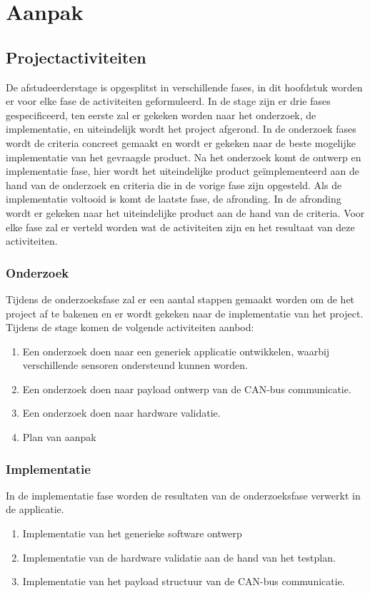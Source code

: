 \chapter{Aanpak} \label{ch:aanpak}

\section{Projectactiviteiten}
De afstudeerderstage is opgesplitst in verschillende fases, in dit hoofdstuk worden er voor elke fase de activiteiten geformuleerd. In de stage zijn er drie fases gespecificeerd, ten eerste zal er gekeken worden naar het onderzoek, de implementatie, en uiteindelijk wordt het project afgerond. In de onderzoek fases wordt de criteria concreet gemaakt en wordt er gekeken naar de beste mogelijke implementatie van het gevraagde product. Na het onderzoek komt de ontwerp en implementatie fase, hier wordt het uiteindelijke product geïmplementeerd aan de hand van de onderzoek en criteria die in de vorige fase zijn opgesteld. Als de implementatie voltooid is komt de laatste fase, de afronding. In de afronding wordt er gekeken naar het uiteindelijke product aan de hand van de criteria. Voor elke fase zal er verteld worden wat de activiteiten zijn en het resultaat van deze activiteiten.

\subsection{Onderzoek}
Tijdens de onderzoeksfase zal er een aantal stappen gemaakt worden om de het project af te bakenen en er wordt gekeken naar de implementatie van het project. Tijdens de stage komen de volgende activiteiten aanbod:
\begin{enumerate}
	\item Een onderzoek doen naar een generiek applicatie ontwikkelen, waarbij verschillende sensoren ondersteund kunnen worden.
	\item Een onderzoek doen naar payload ontwerp van de CAN-bus communicatie.
	\item Een onderzoek doen naar hardware validatie.
	\item Plan van aanpak
\end{enumerate}

\subsection{Implementatie}
In de implementatie fase worden de resultaten van de onderzoeksfase verwerkt in de applicatie. 
\begin{enumerate}
	\item Implementatie van het generieke software ontwerp
	\item Implementatie van de hardware validatie aan de hand van het testplan.
	\item Implementatie van het payload structuur van de CAN-bus communicatie.
\end{enumerate}


